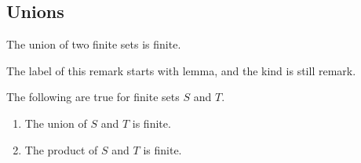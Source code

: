 \subsection{Unions}
\label{subsection-unions}

\noindent
The union of two finite sets is finite.

\begin{remark}
\label{lemma-wrong-prefix}
The label of this remark starts with lemma, and the kind is still remark.
\end{remark}

\begin{lemma}
\label{lemma-items}
The following are true for finite sets $S$ and $T$.
\begin{enumerate}
\item
\label{item-union}
The union of $S$ and $T$ is finite.
\item
\label{item-product}
The product of $S$ and $T$ is finite.
\end{enumerate}
\end{lemma}






